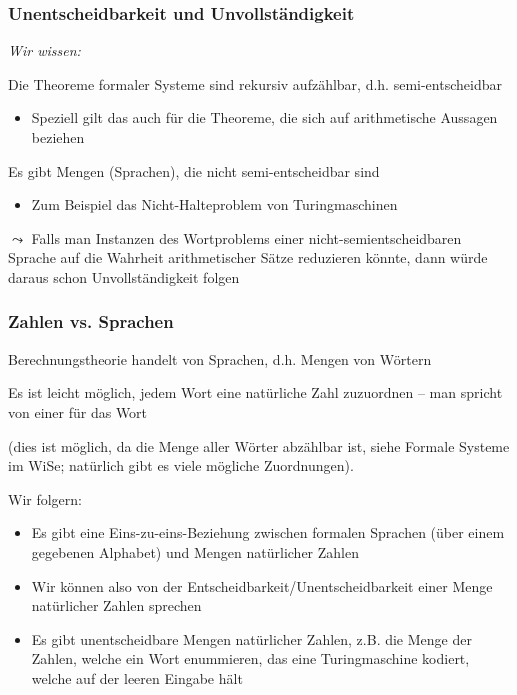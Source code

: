 \documentclass[aspectratio=1610,onlymath]{beamer}
\begin{document}
\begin{frame}\frametitle{Unentscheidbarkeit und Unvollständigkeit}

\emph{Wir wissen:}\medskip

Die Theoreme formaler Systeme sind rekursiv aufzählbar, d.h. semi-entscheidbar
\begin{itemize}
\item Speziell gilt das auch für die Theoreme, die sich auf arithmetische Aussagen beziehen
\end{itemize}\medskip

Es gibt Mengen (Sprachen), die nicht semi-entscheidbar sind
\begin{itemize}
\item Zum Beispiel das Nicht-Halteproblem von Turingmaschinen
\end{itemize}
\bigskip\pause

\alert{
$\leadsto$ Falls man Instanzen des Wortproblems einer nicht-semientscheidbaren Sprache auf die Wahrheit arithmetischer Sätze reduzieren könnte, dann würde daraus schon Unvollständigkeit folgen}

\end{frame}

\begin{frame}\frametitle{Zahlen vs. Sprachen}

Berechnungstheorie handelt von Sprachen, d.h. Mengen von Wörtern
\bigskip

Es ist leicht möglich, jedem Wort eine natürliche Zahl zuzuordnen -- man spricht von einer  für das Wort\\[0.5ex]
{\tiny(dies ist möglich, da die Menge aller Wörter abzählbar ist, siehe Formale Systeme im WiSe; natürlich gibt es viele mögliche Zuordnungen).

}
\bigskip\pause

Wir folgern:
\begin{itemize}
\item Es gibt eine Eins-zu-eins-Beziehung zwischen formalen Sprachen (über einem gegebenen Alphabet) und Mengen natürlicher Zahlen
\item Wir können also von der Entscheidbarkeit/Unentscheidbarkeit einer Menge natürlicher Zahlen sprechen
\item Es gibt unentscheidbare Mengen natürlicher Zahlen, z.B. die Menge der Zahlen, welche ein Wort enummieren, das eine Turingmaschine kodiert, welche auf der leeren Eingabe hält
\end{itemize}

\end{frame}
\end{document}
